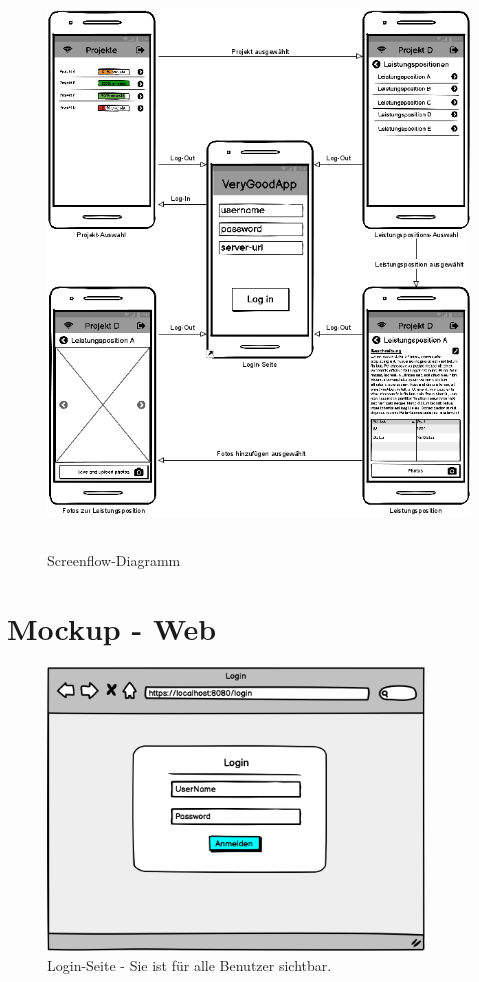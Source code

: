 \begin{figure}[ht]
	\centering
	\includegraphics[width=13cm, height=15cm]{img/mockup-app/Screenflow-App.png}
	\caption{Screenflow-Diagramm}
\end{figure}

\clearpage

\section{Mockup - Web}

\begin{figure}[h]
\centering
\includegraphics[width=10cm]{img/mockup_web/login.png}
\caption{Login-Seite - Sie ist für alle Benutzer sichtbar.}
\end{figure}


